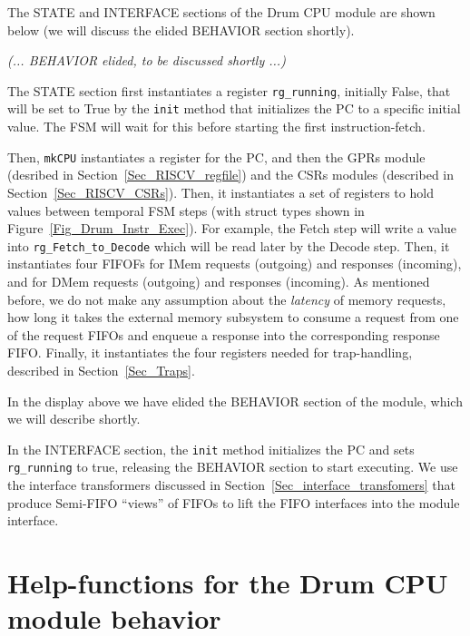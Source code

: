 \label{Sec_Drum_CPU_module}


The STATE and INTERFACE sections of the Drum CPU module are shown
below (we will discuss the elided BEHAVIOR section shortly).



\hm \emph{(... BEHAVIOR elided, to be discussed shortly ...)}



The STATE section first instantiates a register \verb|rg_running|,
initially False, that will be set to True by the \verb|init| method
that initializes the PC to a specific initial value.  The FSM will
wait for this before starting the first instruction-fetch.

Then, \verb|mkCPU| instantiates a register for the PC, and then the
GPRs module (desribed in Section~\ref{Sec_RISCV_regfile}) and the CSRs
modules (described in Section~\ref{Sec_RISCV_CSRs}).  Then, it
instantiates a set of registers to hold values between temporal FSM
steps (with struct types shown in Figure~\ref{Fig_Drum_Instr_Exec}).
For example, the Fetch step will write a value into
\verb|rg_Fetch_to_Decode| which will be read later by the Decode step.
Then, it instantiates four FIFOFs for IMem requests (outgoing) and
responses (incoming), and for DMem requests (outgoing) and responses
(incoming). As mentioned before, we do not make any assumption about
the \emph{latency} of memory requests, {\ie} how long it takes the
external memory subsystem to consume a request from one of the request
FIFOs and enqueue a response into the corresponding response FIFO.
Finally, it instantiates the four registers needed for trap-handling,
described in Section~\ref{Sec_Traps}.

In the display above we have elided the BEHAVIOR section of the
module, which we will describe shortly.

In the INTERFACE section, the \verb|init| method initializes the PC
and sets \verb|rg_running| to true, releasing the BEHAVIOR section to
start executing.  We use the interface transformers discussed in
Section~\ref{Sec_interface_transfomers} that produce Semi-FIFO
``views'' of FIFOs to lift the FIFO interfaces into the module
interface.


\section{Help-functions for the Drum CPU module behavior}

